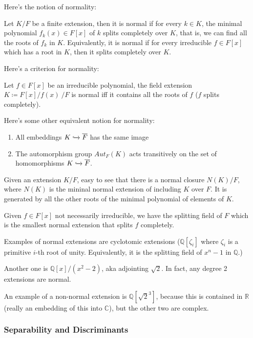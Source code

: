 \documentclass[main.tex]{subfiles}
\begin{document}
Here's the notion of normality:
\begin{definition}
Let $K/F$ be a finite extension, then it is normal if for every $k \in K$, the minimal polynomial $f_k(x) \in F[x]$ of $k$ splits completely over $K$, that is, we can find all the roots of $f_k$ in $K$. Equivalently, it is normal if for every irreducible $f \in F[x]$ which has a root in $K$, then it splits completely over $K$.
\end{definition}

Here's a criterion for normality: 
\begin{lemma}
Let $f \in F[x]$ be an irreducible polynomial, the field extension $K \coloneqq  F[x]/f(x)\ /F $ is normal iff it contains all the roots of $f$ ($f$ splits completely).
\end{lemma}

Here's some other equivalent notion for normality:
\begin{enumerate}
    \item All embeddings $K \xhookrightarrow{} \overline{F}$
    has the same image
    \item The automorphism group $Aut_F(K)$ acts transitively on the set of homomorphisms $K \xhookrightarrow{} \overline{F}$.
\end{enumerate}

Given an extension $K/F$, easy to see that there is a normal closure $N(K)/F$, where $N(K)$ is the mininal normal extension of including $K$ over $F$. It is generated by all the other roots of the minimal polynomial of elements of $K$. 

Given $f \in F[x]$ not necessarily irreducible, we have the splitting field of $F$ which is the smallest normal extension that splits $f$ completely.

\begin{example}
Examples of normal extensions are cyclotomic extensions ($\mathbb{Q}[\zeta_i]$ where $\zeta_i$ is a primitive $i$-th root of unity. Equivalently, it is the splitting field of $x^n -1$ in $\mathbb{Q}$.) 

Another one is $\mathbb{Q}[x]/(x^2 - 2)$, aka adjointing $\sqrt{2}$. In fact, any degree 2 extensions are normal. 

An example of a non-normal extension is $\mathbb{Q}[\sqrt{2}^3]$, because this is contained in $\mathbb{R}$ (really an embedding of this into $\mathbb{C}$), but the other two are complex. 
\end{example}


\subsubsection{Separability and Discriminants}
\end{document}
